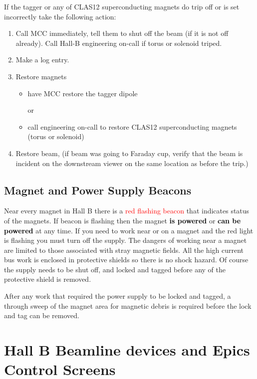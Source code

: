 \documentclass[12pt]{article}
\begin{document}
If the tagger or any of CLAS12 superconducting magnets do trip off or is set incorrectly take the following action:

\begin{enumerate}
\item Call MCC immediately, tell them to shut off the beam (if it is not off already). Call Hall-B engineering on-call if torus or solenoid triped.
\item Make a log entry.
\item Restore magnets 
\begin{itemize}
\item have MCC restore the tagger dipole 

or 

\item call engineering on-call to restore CLAS12 superconducting magnets (torus or solenoid)
\end{itemize}
\item Restore beam, (if beam was going to Faraday cup, verify that the beam is incident on the downstream viewer on the same location as before the trip.)
\end{enumerate}

\subsection{Magnet and Power Supply Beacons}
\indent

Near every magnet in Hall B there is a \textcolor{red}{red flashing beacon} that indicates status of the magnets. If beacon is
flashing then the magnet \textbf{\textcolor{black}{is powered}} or \textbf{\textcolor{black}{can be powered}} at
any time. If you need to work near or on a magnet and the red light is flashing
you must turn off the supply. The dangers of working
near a magnet are limited to those associated with stray magnetic fields. All
the high current bus work is enclosed in protective shields so there is no shock
hazard. Of course the supply needs to be shut off, and locked and tagged before
any of the protective shield is removed.

After any work that required the power supply to be locked and tagged, a through
sweep of the magnet area for magnetic debris is required before the lock and
tag can be removed.


\section{Hall B Beamline devices and Epics Control Screens}
\end{document}
